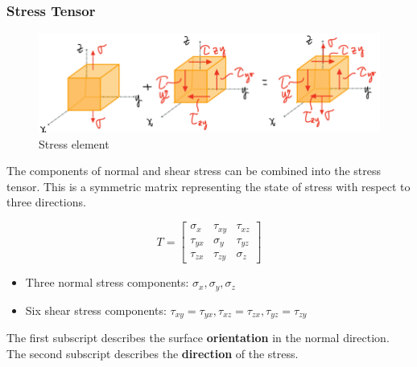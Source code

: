 \subsubsection{Stress Tensor}

\begin{figure}[!h]
\centering
\includegraphics[angle=0, width=\columnwidth]{Stress-Figures/Stress Element.png}
\vspace{-2mm}
\caption{\small Stress element}
\vspace{-3mm}
\label{Fig:Element}
\end{figure}

\noindent The components of normal and shear stress can be combined into the stress tensor. This is a symmetric matrix representing the state of stress with respect to three directions.

\[ T= \begin{bmatrix} \sigma_{x} & \tau_{xy} & \tau_{xz} \\ \tau_{yx}& \sigma_{y} & \tau_{yz} \\ \tau_{zx}&\tau_{zy}&\sigma_{z} \end{bmatrix} \]


\begin{itemize}
    \item  Three normal stress components: $\sigma_x, \sigma_y, \sigma_z$
    \item Six shear stress components: $\tau_{xy} =\tau_{yx}, \tau_{xz}=\tau_{zx}, \tau_{yz}=\tau_{zy}$
\end{itemize}

\noindent The first subscript describes the surface \textbf{orientation} in the normal direction. The second subscript describes the \textbf{direction} of the stress.


